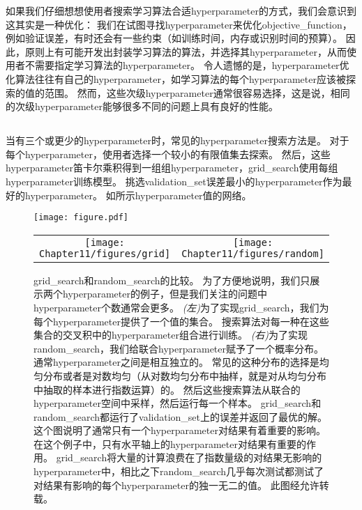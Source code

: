 如果我们仔细想想使用者搜索学习算法合适\gls{hyperparameter}的方式，我们会意识到这其实是一种优化：
我们在试图寻找\gls{hyperparameter}来优化\gls{objective_function}，例如验证误差，有时还会有一些约束（如训练时间，内存或识别时间的预算）。
因此，原则上有可能开发出封装学习算法的算法，并选择其\gls{hyperparameter}，从而使用者不需要指定学习算法的\gls{hyperparameter}。
令人遗憾的是，\gls{hyperparameter}优化算法往往有自己的\gls{hyperparameter}，如学习算法的每个\gls{hyperparameter}应该被探索的值的范围。
然而，这些次级\gls{hyperparameter}通常很容易选择，这是说，相同的次级\gls{hyperparameter}能够很多不同的问题上具有良好的性能。


\subsection{}
\label{sec:grid_search}
当有三个或更少的\gls{hyperparameter}时，常见的\gls{hyperparameter}搜索方法是。
对于每个\gls{hyperparameter}，使用者选择一个较小的有限值集去探索。
然后，这些\gls{hyperparameter}笛卡尔乘积得到一组组\gls{hyperparameter}，\gls{grid_search}使用每组\gls{hyperparameter}训练模型。
挑选\gls{validation_set}误差最小的\gls{hyperparameter}作为最好的\gls{hyperparameter}。
如所示\gls{hyperparameter}值的网络。


\begin{figure}[!htb]
\ifOpenSource
\centerline{\texttt{[image: figure.pdf]}}
\else
\begin{tabular}{cc}
\texttt{[image: Chapter11/figures/grid]} &
\texttt{[image: Chapter11/figures/random]}
\end{tabular}
\fi
\caption{\gls{grid_search}和\gls{random_search}的比较。
为了方便地说明，我们只展示两个\gls{hyperparameter}的例子，但是我们关注的问题中\gls{hyperparameter}个数通常会更多。
\emph{(左)}为了实现\gls{grid_search}，我们为每个\gls{hyperparameter}提供了一个值的集合。
搜索算法对每一种在这些集合的交叉积中的\gls{hyperparameter}组合进行训练。
\emph{(右)}为了实现\gls{random_search}，我们给联合\gls{hyperparameter}赋予了一个概率分布。
通常\gls{hyperparameter}之间是相互独立的。
常见的这种分布的选择是均匀分布或者是对数均匀（从对数均匀分布中抽样，就是对从均匀分布中抽取的样本进行指数运算）的。
然后这些搜索算法从联合的\gls{hyperparameter}空间中采样，然后运行每一个样本。
\gls{grid_search}和\gls{random_search}都运行了\gls{validation_set}上的误差并返回了最优的解。
这个图说明了通常只有一个\gls{hyperparameter}对结果有着重要的影响。
在这个例子中，只有水平轴上的\gls{hyperparameter}对结果有重要的作用。
\gls{grid_search}将大量的计算浪费在了指数量级的对结果无影响的\gls{hyperparameter}中，相比之下\gls{random_search}几乎每次测试都测试了对结果有影响的每个\gls{hyperparameter}的独一无二的值。
此图经\citet{Bergstra+Bengio-LW2011}允许转载。}
\label{fig:chap11_grid_vs_random}
\end{figure}


